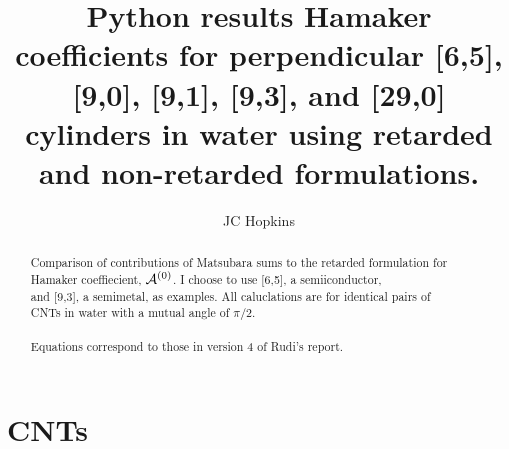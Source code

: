 \documentclass[a4paper]{article}
\title{\bf Python results Hamaker coefficients for perpendicular [6,5], [9,0],
[9,1], [9,3], and [29,0] cylinders in water using retarded and non-retarded formulations.}
\author{JC Hopkins}
\begin{document}
\maketitle
\begin{abstract}
Comparison of contributions of Matsubara sums to the retarded formulation for\\
Hamaker coeffiecient, ${\cal A}^{(0)}$.  I choose to use [6,5], a
semiiconductor,\\
and [9,3], a semimetal, as examples. All caluclations are for identical pairs
of\\
CNTs in water with a mutual angle of $\pi/2$. \\
\\
Equations correspond to those in version 4 of Rudi's report.
\end{abstract}
\tableofcontents

\section{CNTs}
\end{document}
